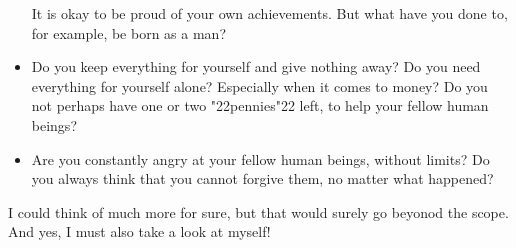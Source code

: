\documentclass[12pt,a5paper]{article}
\newcommand{\q}[1]{\char"22{#1}\char"22 }
\begin{document}
\begin{itemize}[nosep]
					It is okay to be proud of your own achievements.
					But what have you done to,
					for example,
					be born as a man?
					\\
			\item	Do you keep everything for yourself and give nothing away?
					Do you need everything for yourself alone?
					Especially when it comes to money?
					Do you not perhaps have one or two \q{pennies} left,
					to help your fellow human beings?
					\\
			\item	Are you constantly angry at your fellow human beings,
					without limits?
					Do you always think that you cannot forgive them,
					no matter what happened?
					\\
		\end{itemize}
		I could think of much more for sure,
		but that would surely go beyonod the scope.
		And yes,
		I must also take a look at myself!
		
\end{document}
